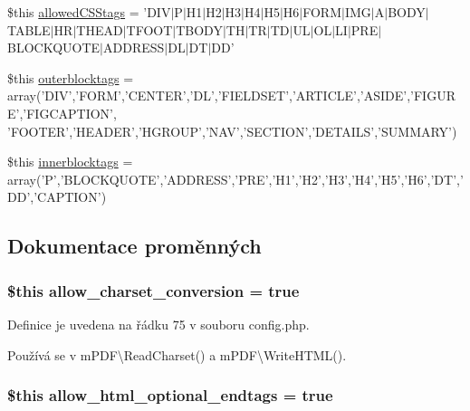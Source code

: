 \begin{DoxyCompactItemize}
\item 
\$this \hyperlink{config_8php_a47f216504b9328e6307ee0d9d3cbe0ba}{allowed\-C\-S\-Stags} = 'D\-I\-V$|$P$|$H1$|$H2$|$H3$|$H4$|$H5$|$H6$|$F\-O\-R\-M$|$I\-M\-G$|$A$|$B\-O\-D\-Y$|$T\-A\-B\-L\-E$|$H\-R$|$T\-H\-E\-A\-D$|$T\-F\-O\-O\-T$|$T\-B\-O\-D\-Y$|$T\-H$|$T\-R$|$T\-D$|$U\-L$|$O\-L$|$L\-I$|$P\-R\-E$|$B\-L\-O\-C\-K\-Q\-U\-O\-T\-E$|$A\-D\-D\-R\-E\-S\-S$|$D\-L$|$D\-T$|$D\-D'
\item 
\$this \hyperlink{config_8php_ac0ca79c9726d84d36829204a5a64b232}{outerblocktags} = array('D\-I\-V','F\-O\-R\-M','C\-E\-N\-T\-E\-R','D\-L','F\-I\-E\-L\-D\-S\-E\-T','A\-R\-T\-I\-C\-L\-E','A\-S\-I\-D\-E','F\-I\-G\-U\-R\-E','F\-I\-G\-C\-A\-P\-T\-I\-O\-N', 'F\-O\-O\-T\-E\-R','H\-E\-A\-D\-E\-R','H\-G\-R\-O\-U\-P','N\-A\-V','S\-E\-C\-T\-I\-O\-N','D\-E\-T\-A\-I\-L\-S','S\-U\-M\-M\-A\-R\-Y')
\item 
\$this \hyperlink{config_8php_ad02a87c52cbc668e95248ad4f473bca8}{innerblocktags} = array('P','B\-L\-O\-C\-K\-Q\-U\-O\-T\-E','A\-D\-D\-R\-E\-S\-S','P\-R\-E','H1','H2','H3','H4','H5','H6','D\-T','D\-D','C\-A\-P\-T\-I\-O\-N')
\end{DoxyCompactItemize}


\subsection{Dokumentace proměnných}
\hypertarget{config_8php_acf49acd024290d78ee8b94459a4ae703}{
\subsubsection[{allow\-\_\-charset\-\_\-conversion}]{\setlength{\rightskip}{0pt plus 5cm}\$this allow\-\_\-charset\-\_\-conversion = true}}\label{config_8php_acf49acd024290d78ee8b94459a4ae703}


Definice je uvedena na řádku 75 v souboru config.\-php.



Používá se v m\-P\-D\-F\textbackslash{}\-Read\-Charset() a m\-P\-D\-F\textbackslash{}\-Write\-H\-T\-M\-L().

\hypertarget{config_8php_a0c175fde7f6392aaa72e9cf5d933cf5b}{
\subsubsection[{allow\-\_\-html\-\_\-optional\-\_\-endtags}]{\setlength{\rightskip}{0pt plus 5cm}\$this allow\-\_\-html\-\_\-optional\-\_\-endtags = true}}\label{config_8php_a0c175fde7f6392aaa72e9cf5d933cf5b}


